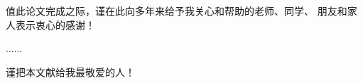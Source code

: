 \begin{table}[c]
\centering 
\parbox{0.5\textwidth}{

\begin{centerlastline}\noindent
值此论文完成之际，谨在此向多年来给予我关心和帮助的老师、同学、
朋友和家人表示衷心的感谢！
\end{centerlastline}

\begin{center}

......

\vskip 18pt
谨把本文献给我最敬爱的人！
\end{center}
}
\end{table}
